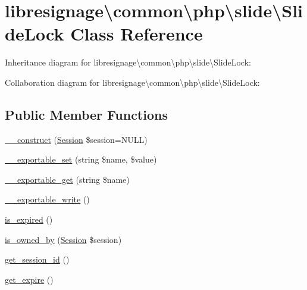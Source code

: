 \hypertarget{classlibresignage_1_1common_1_1php_1_1slide_1_1SlideLock}{}\section{libresignage\textbackslash{}common\textbackslash{}php\textbackslash{}slide\textbackslash{}Slide\+Lock Class Reference}
\label{classlibresignage_1_1common_1_1php_1_1slide_1_1SlideLock}


Inheritance diagram for libresignage\textbackslash{}common\textbackslash{}php\textbackslash{}slide\textbackslash{}Slide\+Lock\+:


Collaboration diagram for libresignage\textbackslash{}common\textbackslash{}php\textbackslash{}slide\textbackslash{}Slide\+Lock\+:
\subsection*{Public Member Functions}
\begin{DoxyCompactItemize}
\item 
\hyperlink{classlibresignage_1_1common_1_1php_1_1slide_1_1SlideLock_aa0d2ffadfe5f362cfea049d2cacad1ac}{\+\_\+\+\_\+construct} (\hyperlink{classlibresignage_1_1common_1_1php_1_1auth_1_1Session}{Session} \$session=N\+U\+LL)
\item 
\hyperlink{classlibresignage_1_1common_1_1php_1_1slide_1_1SlideLock_ae578e91f5623e7b13bba0f069eea3318}{\+\_\+\+\_\+exportable\+\_\+set} (string \$name, \$value)
\item 
\hyperlink{classlibresignage_1_1common_1_1php_1_1slide_1_1SlideLock_a66f063017a17b68c12f18f78c1cd4a32}{\+\_\+\+\_\+exportable\+\_\+get} (string \$name)
\item 
\hyperlink{classlibresignage_1_1common_1_1php_1_1slide_1_1SlideLock_a568f13369d92a6d85b45a3ab3e52705c}{\+\_\+\+\_\+exportable\+\_\+write} ()
\item 
\hyperlink{classlibresignage_1_1common_1_1php_1_1slide_1_1SlideLock_a77e783e403c8a8b707d083969423cfb0}{is\+\_\+expired} ()
\item 
\hyperlink{classlibresignage_1_1common_1_1php_1_1slide_1_1SlideLock_a4a5bc1b2cc6ccf15ff0a4e4ab0cfbfb3}{is\+\_\+owned\+\_\+by} (\hyperlink{classlibresignage_1_1common_1_1php_1_1auth_1_1Session}{Session} \$session)
\item 
\hyperlink{classlibresignage_1_1common_1_1php_1_1slide_1_1SlideLock_a176b80f88c66aace4a206b38b9747125}{get\+\_\+session\+\_\+id} ()
\item 
\hyperlink{classlibresignage_1_1common_1_1php_1_1slide_1_1SlideLock_ad361d6c7fe8f492c888d026c2993b826}{get\+\_\+expire} ()
\end{DoxyCompactItemize}
